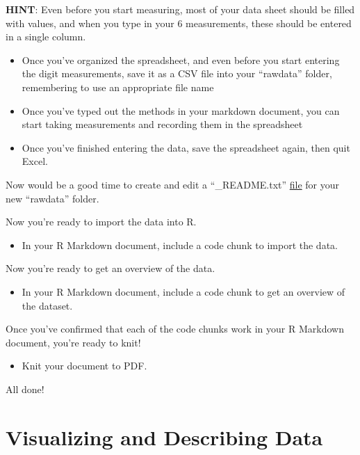 \documentclass[
]{book}
\providecommand{\tightlist}{%
  \setlength{\itemsep}{0pt}\setlength{\parskip}{0pt}}
\begin{document}
\textbf{HINT}: Even before you start measuring, most of your data sheet should be filled with values, and when you type in your 6 measurements, these should be entered in a single column.

\begin{itemize}
\tightlist
\item
  Once you've organized the spreadsheet, and even before you start entering the digit measurements, save it as a CSV file into your ``rawdata'' folder, remembering to use an appropriate file name
\item
  Once you've typed out the methods in your markdown document, you can start taking measurements and recording them in the spreadsheet
\item
  Once you've finished entering the data, save the spreadsheet again, then quit Excel.
\end{itemize}

Now would be a good time to create and edit a ``\_README.txt'' \hyperref[setup_dirs]{file} for your new ``rawdata'' folder.

Now you're ready to import the data into R.

\begin{itemize}
\tightlist
\item
  In your R Markdown document, include a code chunk to import the data.
\end{itemize}

Now you're ready to get an overview of the data.

\begin{itemize}
\tightlist
\item
  In your R Markdown document, include a code chunk to get an overview of the dataset.
\end{itemize}

Once you've confirmed that each of the code chunks work in your R Markdown document, you're ready to knit!

\begin{itemize}
\tightlist
\item
  Knit your document to PDF.
\end{itemize}

All done!

\part*{Visualizing and Describing Data}\label{part-visualizing-and-describing-data}
\end{document}
